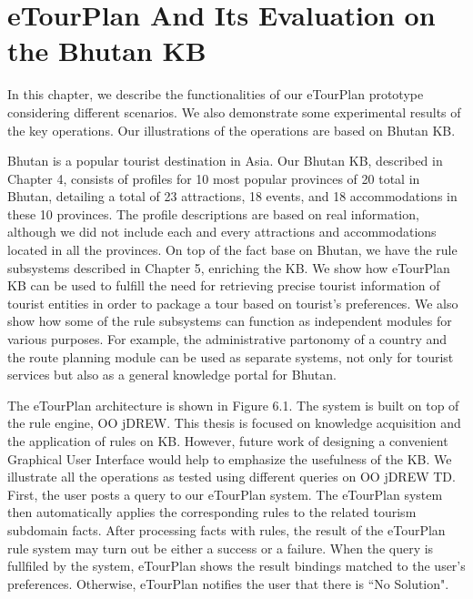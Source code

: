 \chapter{eTourPlan And Its Evaluation on the Bhutan KB}

\hspace{0.3in}In this chapter, we describe the functionalities of our eTourPlan prototype considering different scenarios. We also demonstrate some experimental results of the key operations. Our illustrations of the operations are based on Bhutan KB. 

\hspace{0.3in}Bhutan is a popular tourist destination in Asia. Our Bhutan KB, described in Chapter 4, consists of profiles for 10 most popular provinces of 20 total in Bhutan, detailing a total of 23 attractions, 18 events, and 18 accommodations in these 10 provinces. The profile descriptions are based on real information, although we did not include each and every attractions and accommodations located in all the provinces. On top of the fact base on Bhutan, we have the rule subsystems described in Chapter 5, enriching the KB. We show how eTourPlan KB can be used to fulfill the need for retrieving precise tourist information of tourist entities in order to package a tour based on tourist's preferences. We also show how some of the rule subsystems can function as independent modules for various purposes. For example, the administrative partonomy of a country and the route planning module can be used as separate systems, not only for tourist services but also as a general knowledge portal for Bhutan.

\hspace{0.3in}The eTourPlan architecture is shown in Figure 6.1. The system is built on top of the rule engine, OO jDREW. This thesis is focused on knowledge acquisition and the application of rules on KB. However, future work of designing a convenient Graphical User Interface would help to emphasize the usefulness of the KB. We illustrate all the operations as tested using different queries on OO jDREW TD. First, the user posts a query to our eTourPlan system. The eTourPlan system then automatically applies the corresponding rules to the related tourism subdomain facts. After processing facts with rules, the result of the eTourPlan rule system may turn out be either a success or a failure. When the query is fullfiled by the system, eTourPlan shows the result bindings matched to the user's preferences. Otherwise, eTourPlan notifies the user that there is ``No Solution".  

